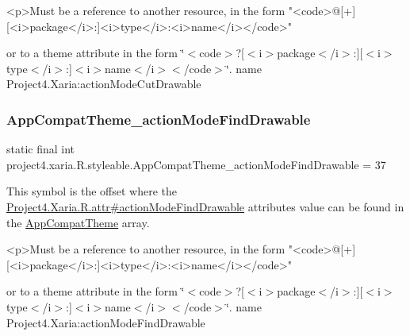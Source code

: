 \begin{DoxyVerb}      <p>Must be a reference to another resource, in the form "<code>@[+][<i>package</i>:]<i>type</i>:<i>name</i></code>"
\end{DoxyVerb}
 or to a theme attribute in the form \char`\"{}$<$code$>$?\mbox{[}$<$i$>$package$<$/i$>$\+:\mbox{]}\mbox{[}$<$i$>$type$<$/i$>$\+:\mbox{]}$<$i$>$name$<$/i$>$$<$/code$>$\char`\"{}.  name Project4.\+Xaria\+:action\+Mode\+Cut\+Drawable \mbox{\label{classproject4_1_1xaria_1_1R_1_1styleable_a583749c75ba069fcac9c2290f3422f99}} 
\subsubsection{\texorpdfstring{App\+Compat\+Theme\+\_\+action\+Mode\+Find\+Drawable}{AppCompatTheme\_actionModeFindDrawable}}
{\footnotesize\ttfamily static final int project4.\+xaria.\+R.\+styleable.\+App\+Compat\+Theme\+\_\+action\+Mode\+Find\+Drawable = 37\hspace{0.3cm}{\ttfamily [static]}}

This symbol is the offset where the \hyperlink{}{Project4.\+Xaria.\+R.\+attr\#action\+Mode\+Find\+Drawable} attribute\textquotesingle{}s value can be found in the \hyperlink{classproject4_1_1xaria_1_1R_1_1styleable_aad8bec413e2350f9404e6ff0e831a85d}{App\+Compat\+Theme} array.

\begin{DoxyVerb}      <p>Must be a reference to another resource, in the form "<code>@[+][<i>package</i>:]<i>type</i>:<i>name</i></code>"
\end{DoxyVerb}
 or to a theme attribute in the form \char`\"{}$<$code$>$?\mbox{[}$<$i$>$package$<$/i$>$\+:\mbox{]}\mbox{[}$<$i$>$type$<$/i$>$\+:\mbox{]}$<$i$>$name$<$/i$>$$<$/code$>$\char`\"{}.  name Project4.\+Xaria\+:action\+Mode\+Find\+Drawable \mbox{\label{classproject4_1_1xaria_1_1R_1_1styleable_a39092e8a0c13ec2bfb8555ab61ff14d1}} 
